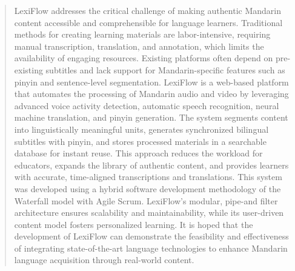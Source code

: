 \documentclass[oneside]{utmthesis}
\begin{document}
\begin{abstract}
    LexiFlow addresses the critical challenge of making authentic Mandarin content accessible and comprehensible for language learners. Traditional methods for creating learning materials are labor-intensive, requiring manual transcription, translation, and annotation, which limits the availability of engaging resources. Existing platforms often depend on pre-existing subtitles and lack support for Mandarin-specific features such as pinyin and sentence-level segmentation. LexiFlow is a web-based platform that automates the processing of Mandarin audio and video by leveraging advanced voice activity detection, automatic speech recognition, neural machine translation, and pinyin generation. The system segments content into linguistically meaningful units, generates synchronized bilingual subtitles with pinyin, and stores processed materials in a searchable database for instant reuse. This approach reduces the workload for educators, expands the library of authentic content, and provides learners with accurate, time-aligned transcriptions and translations. This system was developed using a hybrid software development methodology of the Waterfall model with Agile Scrum. LexiFlow’s modular, pipe-and filter architecture ensures scalability and maintainability, while its user-driven content model fosters personalized learning. It is hoped that the development of LexiFlow can demonstrate the feasibility and effectiveness of integrating state-of-the-art language technologies to enhance Mandarin language acquisition through real-world content.
\end{abstract}
\end{document}
